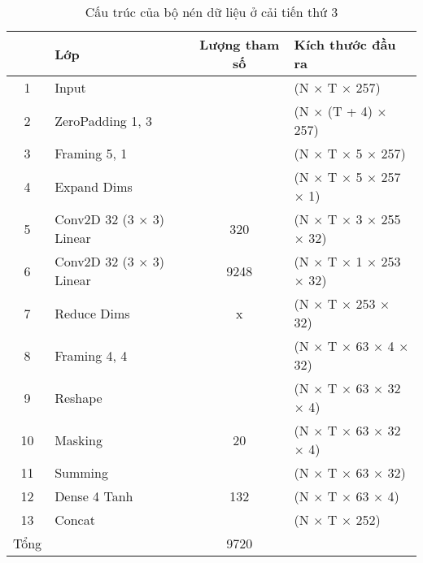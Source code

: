 				\begin{table}
					\centering
					\begin{tabular}{c l c l}
						\hline
						& \textbf{Lớp}		& \textbf{Lượng tham số}		& \textbf{Kích thước đầu ra} \\
						\hline
						1		& Input						&								& (N $\times$ T $\times$ 257) \\
						2		& ZeroPadding 1, 3			&								& (N $\times$ (T + 4) $\times$ 257) \\
						3		& Framing 5, 1				&								& (N $\times$ T $\times$ 5 $\times$ 257) \\
						4		& Expand Dims				&								& (N $\times$ T $\times$ 5 $\times$ 257 $\times$ 1) \\
						5		& Conv2D 32 (3 $\times$ 3) Linear	&	320							& (N $\times$ T $\times$ 3 $\times$ 255 $\times$ 32) \\
						6		& Conv2D 32 (3 $\times$ 3)	Linear	&	9248						& (N $\times$ T $\times$ 1 $\times$ 253 $\times$ 32) \\
						7		& Reduce Dims				&		x						& (N $\times$ T $\times$ 253 $\times$ 32) \\
						8		& Framing 4, 4				&								& (N $\times$ T $\times$ 63 $\times$ 4 $\times$ 32) \\
						9		& Reshape					&								& (N $\times$ T $\times$ 63 $\times$ 32 $\times$ 4) \\
						10		& Masking					&	20							& (N $\times$ T $\times$ 63 $\times$ 32 $\times$ 4) \\
						11		& Summing					&								& (N $\times$ T $\times$ 63 $\times$ 32) \\
						12		& Dense 4 Tanh				&	132							& (N $\times$ T $\times$ 63 $\times$ 4) \\
						13		& Concat					&								& (N $\times$ T $\times$ 252) \\
						\hline
						Tổng	& 							&	9720						& \\
						\hline
					\end{tabular}
					\caption{Cấu trúc của bộ nén dữ liệu ở cải tiến thứ 3}
					\label{rl::post_lookahead_compress_mechanism}
				\end{table}
			
